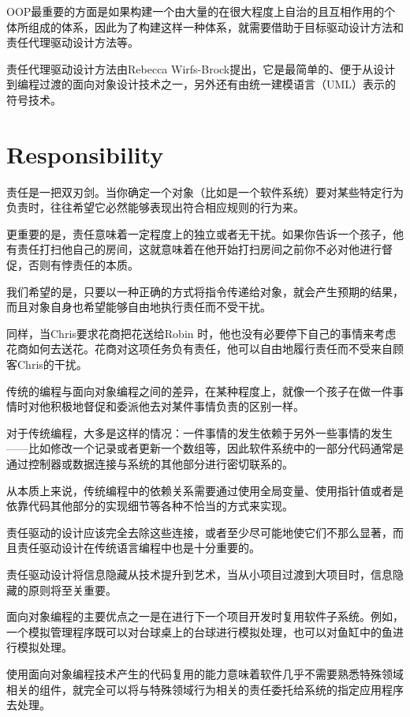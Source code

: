 OOP最重要的方面是如果构建一个由大量的在很大程度上自治的且互相作用的个体所组成的体系，因此为了构建这样一种体系，就需要借助于目标驱动设计方法和责任代理驱动设计方法等。

责任代理驱动设计方法由Rebecca Wirfs-Brock提出，它是最简单的、便于从设计到编程过渡的面向对象设计技术之一，另外还有由统一建模语言（UML）表示的符号技术。

\section{Responsibility}

责任是一把双刃剑。当你确定一个对象（比如是一个软件系统）要对某些特定行为负责时，往往希望它必然能够表现出符合相应规则的行为来。


更重要的是，责任意味着一定程度上的独立或者无干扰。如果你告诉一个孩子，他有责任打扫他自己的房间，这就意味着在他开始打扫房间之前你不必对他进行督促，否则有悖责任的本质。

我们希望的是，只要以一种正确的方式将指令传递给对象，就会产生预期的结果，而且对象自身也希望能够自由地执行责任而不受干扰。

同样，当Chris要求花商把花送给Robin 时，他也没有必要停下自己的事情来考虑花商如何去送花。花商对这项任务负有责任，他可以自由地履行责任而不受来自顾客Chris的干扰。

传统的编程与面向对象编程之间的差异，在某种程度上，就像一个孩子在做一件事情时对他积极地督促和委派他去对某件事情负责的区别一样。

对于传统编程，大多是这样的情况：一件事情的发生依赖于另外一些事情的发生——比如修改一个记录或者更新一个数组等，因此软件系统中的一部分代码通常是通过控制器或数据连接与系统的其他部分进行密切联系的。

从本质上来说，传统编程中的依赖关系需要通过使用全局变量、使用指针值或者是依靠代码其他部分的实现细节等各种不恰当的方式来实现。

责任驱动的设计应该完全去除这些连接，或者至少尽可能地使它们不那么显著，而且责任驱动设计在传统语言编程中也是十分重要的。

责任驱动设计将信息隐藏从技术提升到艺术，当从小项目过渡到大项目时，信息隐藏的原则将至关重要。


面向对象编程的主要优点之一是在进行下一个项目开发时复用软件子系统。例如，一个模拟管理程序既可以对台球桌上的台球进行模拟处理，也可以对鱼缸中的鱼进行模拟处理。

使用面向对象编程技术产生的代码复用的能力意味着软件几乎不需要熟悉特殊领域相关的组件，就完全可以将与特殊领域行为相关的责任委托给系统的指定应用程序去处理。

